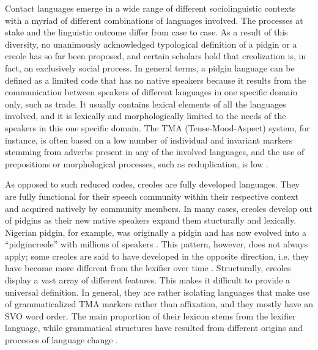 \documentclass[output=paper,
modfonts
]{langscibook}
\begin{document}
Contact languages emerge in a wide range of different sociolinguistic contexts with a myriad of different combinations of languages involved. The processes at stake and the linguistic outcome differ from case to case. As a result of this diversity, no unanimously acknowledged typological definition of a pidgin or a creole has so far been proposed, and certain scholars
\citep[e.g.][]{mufwene2008language} hold that creolization is, in fact, an exclusively social process. In general terms, a pidgin language can be defined as a limited code that has no native speakers because it results from the communication between speakers of different languages in one specific domain only, such as trade. It usually contains lexical elements of all the languages involved, and it is lexically and morphologically limited to the needs of the speakers in this one specific domain. The TMA (Tense-Mood-Aspect) system, for instance, is often based on a low number of individual and invariant markers stemming from adverbs present in any of the involved languages, and the use of prepositions or morphological processes, such as reduplication, is low \citep{bakker2008pidgins}.

As opposed to such reduced codes, creoles are fully developed languages. They are fully functional for their speech community within their respective context and acquired natively by community members. In many cases, creoles develop out of pidgins as their new native speakers expand them stucturally and lexically. Nigerian pidgin, for example, was originally a pidgin and has now evolved into a “pidgincreole” with millions of speakers \citep{bakker2008pidgins}. This pattern, however, does not always apply; some creoles are said to have developed in the opposite direction, i.e. they have become more different from the lexifier over time \citep{chaudenson2001creolization}. Structurally, creoles display a vast array of different features. This makes it difficult to provide a universal definition. In general, they are rather isolating languages that make use of grammaticalized TMA markers rather than affixation, and they mostly have an SVO word order. The main proportion of their lexicon stems from the lexifier language, while grammatical structures have resulted from different origins and processes of language change \citep{bakker2008pidgins, bartens2013creole}.
\end{document}
